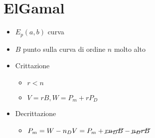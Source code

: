 \newpage
\section{ElGamal}

\begin{itemize}
    \item $E_p(a, b)$ curva
    \item $B$ punto sulla curva di ordine $n$ molto alto
    \item Crittazione
    \begin{itemize}
        \item $r < n$
        \item $V = rB, W = P_m + rP_D$
    \end{itemize}
    \item Decrittazione
    \begin{itemize}
        \item $P_m = W - n_DV = P_m + \cancel{rn_DB} - \cancel{n_DrB}$
    \end{itemize}
\end{itemize}